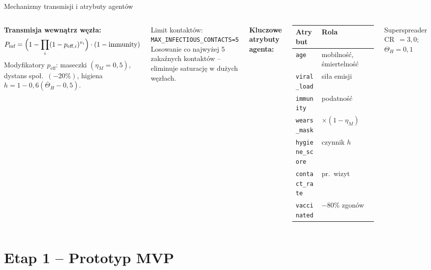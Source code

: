 \documentclass[aspectratio=1610, polish]{beamer}
\begin{document}
\begin{frame}{Mechanizmy transmisji i atrybuty agentów}
  \begin{columns}[T]
    \textbf{Transmisja wewnątrz węzła:}
    \[
      P_{\text{inf}} = \Bigl(1 - \prod_{i}(1-p_{\text{eff},i})^{v_i}\Bigr)
        \cdot (1 - \text{immunity})
    \]
    Modyfikatory $p_{\text{eff}}$: maseczki $(\eta_M=0{,}5)$,\\
    dystans społ.\ $(-20\%)$,
    higiena $h = 1\!-\!0{,}6(\bar{\Theta}_H\!-\!0{,}5)$.

    \begin{alertblock}{Limit kontaktów: \texttt{MAX\_INFECTIOUS\_CONTACTS=5}}
      \small Losowanie co najwyżej 5 zakaźnych kontaktów
      -- eliminuje saturację w dużych węzłach.
    \end{alertblock}

    \textbf{Kluczowe atrybuty agenta:}

    \begin{tabular}{ll}
      \toprule
      Atrybut & Rola \\
      \midrule
      \texttt{age} & mobilność, śmiertelność \\
      \texttt{viral\_load} & siła emisji \\
      \texttt{immunity} & podatność \\
      \texttt{wears\_mask} & $\times(1-\eta_M)$ \\
      \texttt{hygiene\_score} & czynnik $h$ \\
      \texttt{contact\_rate} & pr.\ wizyt \\
      \texttt{vaccinated} & $-80\%$ zgonów \\
      \bottomrule
    \end{tabular}

    \vspace{0.2cm}
    \begin{block}{Superspreader}
      CR~$=3{,}0$;\; $\Theta_H=0{,}1$
    \end{block}
  \end{columns}
\end{frame}

\section{Etap 1 -- Prototyp MVP}
\end{document}
